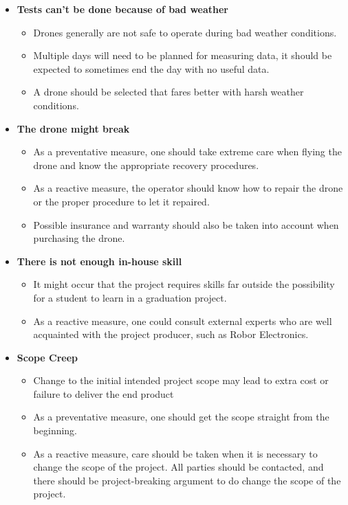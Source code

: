 \documentclass[11pt, a4paper]{article}
\begin{document}
\begin{itemize}
\begin{itemize}
          \end{itemize}
    \item \textbf{Tests can't be done because of bad weather}
          \begin{itemize} 
            \item Drones generally are not safe to operate during bad weather conditions.
            \item Multiple days will need to be planned for measuring data, it should be expected to sometimes end the day with no useful data.
            \item A drone should be selected that fares better with harsh weather conditions.
          \end{itemize}
    \item \textbf{The drone might break}
          \begin{itemize} 
            \item As a preventative measure, one should take extreme care when flying the drone and know the appropriate recovery procedures.
            \item As a reactive measure, the operator should know how to repair the drone or the proper procedure to let it repaired.
            \item Possible insurance and warranty should also be taken into account when purchasing the drone.
          \end{itemize}
    \item \textbf{There is not enough in-house skill}
          \begin{itemize} 
            \item It might occur that the project requires skills far outside the possibility for a student to learn in a graduation project.
            \item As a reactive measure, one could consult external experts who are well acquainted with the project producer, such as Robor Electronics. \cite{robor}
          \end{itemize}
    \item \textbf{Scope Creep}
          \begin{itemize} 
            \item Change to the initial intended project scope may lead to extra cost or failure to deliver the end product
            \item As a preventative measure, one should get the scope straight from the beginning.
            \item As a reactive measure, care should be taken when it is necessary to change the scope of the project. All parties should be contacted, and there should be project-breaking argument to do change the scope of the project.
          \end{itemize}
\end{itemize}
\pagebreak
\printbibliography 
\end{document}
